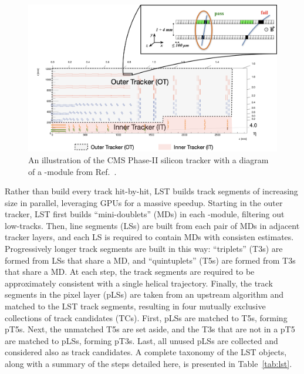 \begin{figure}[!htb]
    \centering
    \includegraphics[width=0.75\linewidth]{fig/lst/tracker_with_pt_module.png}
    \caption{
        An illustration of the CMS Phase-II silicon tracker with a diagram of a \pt-module from Ref.~\cite{CMS-DP-2023-075}. 
    }
    \label{fig:ph2_tracker}
\end{figure}

Rather than build every track hit-by-hit, LST builds track segments of increasing size in parallel, leveraging GPUs for a massive speedup. 
Starting in the outer tracker, LST first builds ``mini-doublets'' (MDs) in each \pt-module, filtering out low-\pt tracks. 
Then, line segments (LSs) are built from each pair of MDs in  adjacent tracker layers, and each LS is required to contain MDs with consisten \pt estimates. 
Progressively longer track segments are built in this way: ``triplets'' (T3s) are formed from LSs that share a MD, and ``quintuplets'' (T5s) are formed from T3s that share a MD. 
At each step, the track segments are required to be approximately consistent with a single helical trajectory. 
Finally, the track segments in the pixel layer (pLSs) are taken from an upstream algorithm and matched to the LST track segments, resulting in four mutually exclusive collections of track candidates (TCs). 
First, pLSs are matched to T5s, forming pT5s. 
Next, the unmatched T5s are set aside, and the T3s that are not in a pT5 are matched to pLSs, forming pT3s. 
Last, all unused pLSs are collected and considered also as track candidates. 
A complete taxonomy of the LST objects, along with a summary of the steps detailed here, is presented in Table~\ref{tab:lst}.

